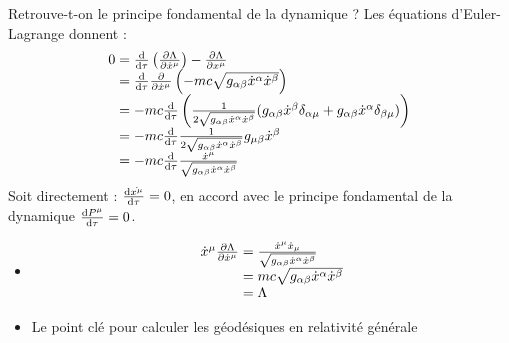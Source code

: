 Retrouve-t-on le principe fondamental de la dynamique ? Les équations d'Euler-Lagrange donnent :
$$
	\begin{array}{r@{\;}l}
		0&=\frac{\dif}{\dif \tau}\left(\frac{\partial\Lambda}{\partial\dot{x}^\mu}\right)-\frac{\partial\Lambda}{\partial x^\mu}\\
			&=\frac{\dif}{\dif\tau}\frac{\partial}{\partial\dot{x}^\mu}\left(-mc\sqrt{g_{\alpha\beta}\dot{x}^{\alpha}\dot{x}^{\beta}}\right)\\
			&=-mc\frac{\dif}{\dif\tau}\left(\frac{1}{2\sqrt{g_{\alpha\beta}\dot{x}^{\alpha}\dot{x}^{\beta}}}( g_{\alpha\beta}\dot{x}^{\beta}\delta_{\alpha\mu}+g_{\alpha\beta}\dot{x}^{\alpha}\delta_{\beta\mu})\right)\\
			&=-mc\frac{\dif}{\dif\tau}\frac{1}{2\sqrt{g_{\alpha\beta}\dot{x}^{\alpha}\dot{x}^{\beta}}}g_{\mu\beta}\dot{x}^{\beta}\\
			&=-mc\frac{\dif}{\dif\tau}\frac{\dot{x}^\mu}{\sqrt{g_{\alpha\beta}\dot{x}^{\alpha}\dot{x}^{\beta}}}
	\end{array}
$$
Soit directement : $\frac{\mathrm{d}\dot{x^\mu}}{\mathrm{d}\tau}=0$, en accord avec le principe fondamental de la dynamique $\frac{\mathrm{d} P^\mu}{\mathrm{d}\tau}=0$.

\begin{remarks}\hspace*{1pt}
	\begin{itemize}
		\item 
		$$
			\begin{array}{r@{\;}l}
				\dot{x}^\mu\frac{\partial\Lambda}{\partial\dot{x}^\mu}&=\frac{\dot{x}^\mu\dot{x}_\mu}{\sqrt{g_{\alpha\beta}\dot{x}^{\alpha}\dot{x}^{\beta}}}\\
					&=mc\sqrt{g_{\alpha\beta}\dot{x}^{\alpha}\dot{x}^{\beta}}\\
					&=\Lambda
			\end{array}
		$$
		\item Le point clé pour calculer les géodésiques en relativité générale 
		
	\end{itemize}
\end{remarks}